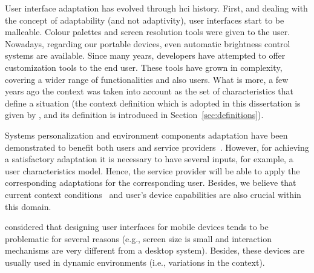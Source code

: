 User interface adaptation has evolved through \ac{hci} history. First, and 
dealing with the concept of adaptability (and not adaptivity), user interfaces 
start to be malleable. Colour palettes and screen resolution tools were given to 
the user. Nowadays, regarding our portable devices, even automatic brightness 
control systems are available. Since many years, developers have attempted to 
offer customization tools to the end user. These tools have grown in complexity, 
covering a wider range of functionalities and also users. What is more, a few 
years ago the context was taken into account as the set of characteristics that 
define a situation (the context definition which is adopted in this dissertation
is given by \citet{dey_understanding_2001}, and its definition is introduced
in Section~\ref{sec:definitions}).

Systems personalization and environment components adaptation have been demonstrated
to benefit both users and service providers~\citep{kobsa_generic_2001}. However, for
achieving a satisfactory adaptation it is necessary to have several inputs, for example,
a user characteristics model. Hence, the service provider will be able to apply the
corresponding adaptations for the corresponding user. Besides, we believe that current
context conditions~\citep{jameson_modelling_2001} and user's device capabilities are also
crucial within this domain. 

\citet{nilsson_model_based_2006} considered that designing user interfaces for
mobile devices tends to be problematic for several reasons (e.g., screen size is
small and interaction mechanisms are very different from a desktop system). Besides,
these devices are usually used in dynamic environments (i.e., variations in the
context). 


